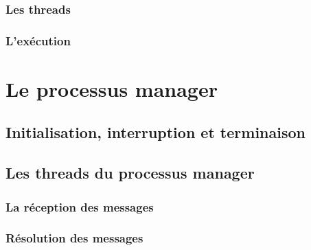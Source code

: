 \documentclass[a4paper,12pt]{article}
\begin{document}
\subsubsection{Les threads}

\subsubsection{L'exécution}

\section{Le processus manager}

\subsection{Initialisation, interruption et terminaison}

\subsection{Les threads du processus manager}

\subsubsection{La réception des messages}

\subsubsection{Résolution des messages}
\end{document}
